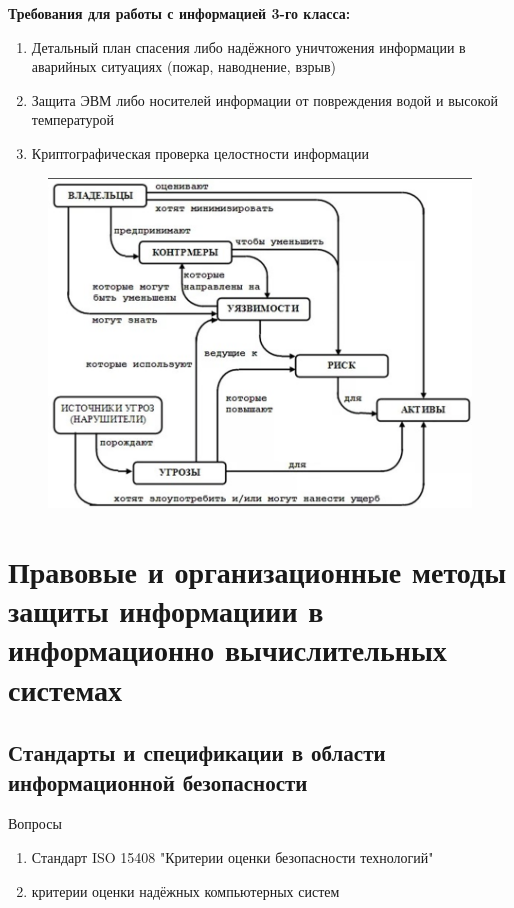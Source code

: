 \documentclass[a4paper,12pt]{extarticle}
\begin{document}
	
	\textbf{Требования для работы с информацией 3-го класса:}
	\begin{enumerate}
		\item Детальный план спасения либо надёжного уничтожения информации в аварийных ситуациях (пожар, наводнение, взрыв)
		\item Защита ЭВМ либо носителей информации от повреждения водой и высокой температурой 
		\item Криптографическая проверка целостности информации
	\end{enumerate}

	
	\begin{figure}
		\centering
		\includegraphics[width=1\linewidth]{screenshot001}
		\caption{}
		\label{fig:screenshot001}
	\end{figure}
	
	
	\section{Правовые и организационные методы защиты информациии в информационно вычислительных системах}
	\subsection{Стандарты и спецификации в области информационной безопасности}
	
	Вопросы
	\begin{enumerate}
		\item Стандарт ISO 15408 "Критерии оценки безопасности технологий"
		\item критерии оценки надёжных компьютерных систем
	\end{enumerate}
\end{document}
